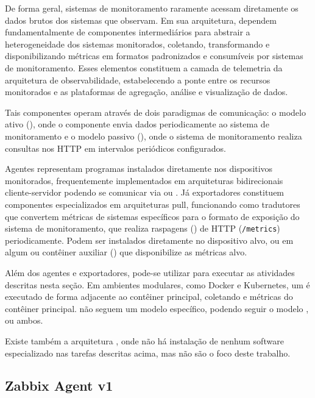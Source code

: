 De forma geral, sistemas de monitoramento raramente acessam diretamente os dados brutos dos sistemas que observam. Em sua arquitetura, dependem fundamentalmente de componentes intermediários para abstrair a heterogeneidade dos sistemas monitorados, coletando, transformando e disponibilizando métricas em formatos padronizados e consumíveis por sistemas de monitoramento. Esses elementos constituem a camada de telemetria da arquitetura de observabilidade, estabelecendo a ponte entre os recursos monitorados e as plataformas de agregação, análise e visualização de dados.

Tais componentes operam através de dois paradigmas de comunicação: o modelo ativo (), onde o componente envia dados periodicamente ao sistema de monitoramento e o modelo passivo (), onde o sistema de monitoramento realiza consultas nos  HTTP em intervalos periódicos configurados.

Agentes representam programas instalados diretamente nos dispositivos monitorados, frequentemente implementados em arquiteturas bidirecionais cliente-servidor podendo se comunicar via  ou . Já exportadores  constituem componentes especializados em arquiteturas pull, funcionando como tradutores que convertem métricas de sistemas específicos para o formato de exposição do sistema de monitoramento, que realiza raspagens () de  HTTP (\verb|/metrics|) periodicamente. Podem ser instalados diretamente no dispositivo alvo, ou em algum  ou contêiner auxiliar () que disponibilize as métricas alvo.

Além dos agentes e exportadores, pode-se utilizar  para executar as atividades descritas nesta seção. Em ambientes modulares, como Docker e Kubernetes, um  é executado de forma adjacente ao contêiner principal, coletando  e métricas do contêiner principal.  não seguem um modelo específico, podendo seguir o modelo ,  ou ambos.

Existe também a arquitetura , onde não há instalação de nenhum software especializado nas tarefas descritas acima, mas não são o foco deste trabalho.

\subsection{Zabbix Agent v1}
\label{subsection:ZabbixAgentV1}

